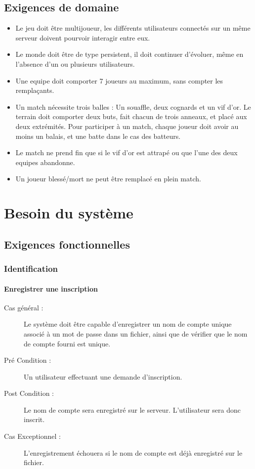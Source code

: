 \documentclass[a4paper]{article}
\begin{document}
\subsection{Exigences de domaine}
\begin{itemize}
\item Le jeu doit être multijoueur, les différents \glspl{utilisateur} connectés sur un même \gls{serveur} doivent pourvoir interagir entre eux.
\item Le monde doit être de type persistent, il doit continuer d'évoluer, même en l'absence d'un ou plusieurs \glspl{utilisateur}.
\item Une \gls{equipe} doit comporter 7 \glspl{joueur} au maximum, sans compter les remplaçants.
\item Un match nécessite trois balles : Un souaffle, deux cognards et un vif d'or. Le terrain doit comporter deux buts, fait chacun de trois anneaux, et placé aux deux extrémités. Pour participer à un match, chaque \gls{joueur} doit avoir au moins un balais, et une batte dans le cas des batteurs.
\item Le match ne prend fin que si le vif d'or est attrapé ou que l'une des deux \glspl{equipe} abandonne.
\item Un \gls{joueur} blessé/mort ne peut être remplacé en plein match.
\end{itemize}


\section{Besoin du système}
\subsection{Exigences fonctionnelles}

\subsubsection{Identification}
\paragraph{Enregistrer une inscription}
\begin{description}
\item[Cas général :] Le système doit être capable d'enregistrer un nom de compte unique associé à un mot de passe dans un fichier, ainsi que de vérifier que le nom de compte fourni est unique.
\item[Pré Condition  :] Un \gls{utilisateur} effectuant une demande d'inscription.
\item[Post Condition :] Le nom de compte sera enregistré sur le serveur. L'utilisateur sera donc inscrit.
\item[Cas Exceptionnel :] L'enregistrement échouera si le nom de compte est déjà enregistré sur le fichier.
\end{description}
\end{document}
